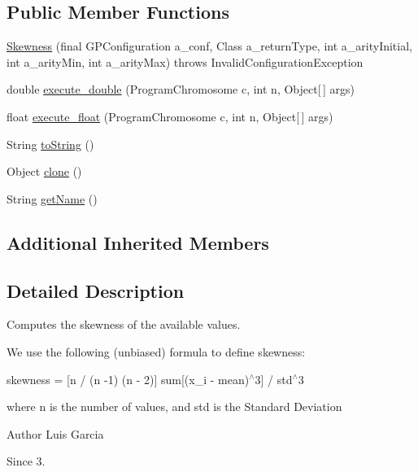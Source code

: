 \subsection*{Public Member Functions}
\begin{DoxyCompactItemize}
\item 
\hyperlink{classorg_1_1jgap_1_1gp_1_1function_1_1statistics_1_1_skewness_a1daae1c2ad7231ec3b1fef77748a0911}{Skewness} (final G\-P\-Configuration a\-\_\-conf, Class a\-\_\-return\-Type, int a\-\_\-arity\-Initial, int a\-\_\-arity\-Min, int a\-\_\-arity\-Max)  throws Invalid\-Configuration\-Exception 
\item 
double \hyperlink{classorg_1_1jgap_1_1gp_1_1function_1_1statistics_1_1_skewness_a9288c7323da1454422cafd8b1737fc9e}{execute\-\_\-double} (Program\-Chromosome c, int n, Object\mbox{[}$\,$\mbox{]} args)
\item 
float \hyperlink{classorg_1_1jgap_1_1gp_1_1function_1_1statistics_1_1_skewness_a632736fece82a9861d6f65e31fca14a7}{execute\-\_\-float} (Program\-Chromosome c, int n, Object\mbox{[}$\,$\mbox{]} args)
\item 
String \hyperlink{classorg_1_1jgap_1_1gp_1_1function_1_1statistics_1_1_skewness_a02c2eea50138710d0526056df12cc86e}{to\-String} ()
\item 
Object \hyperlink{classorg_1_1jgap_1_1gp_1_1function_1_1statistics_1_1_skewness_ac40087c9e03258c930e939316c537c73}{clone} ()
\item 
String \hyperlink{classorg_1_1jgap_1_1gp_1_1function_1_1statistics_1_1_skewness_a820d5f4482cea83f9765ab7ad36aa112}{get\-Name} ()
\end{DoxyCompactItemize}
\subsection*{Additional Inherited Members}


\subsection{Detailed Description}
Computes the skewness of the available values. 

We use the following (unbiased) formula to define skewness\-:

skewness = \mbox{[}n / (n -\/1) (n -\/ 2)\mbox{]} sum\mbox{[}(x\-\_\-i -\/ mean)$^\wedge$3\mbox{]} / std$^\wedge$3 

where n is the number of values, and std is the Standard Deviation 

\begin{DoxyAuthor}{Author}
Luis Garcia 
\end{DoxyAuthor}
\begin{DoxySince}{Since}
3. 
\end{DoxySince}


